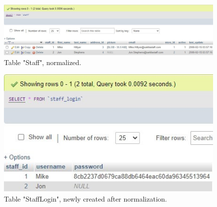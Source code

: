 \documentclass[openany]{article}
\begin{document}
		\begin{figure}[H]
			\includegraphics[width=\textwidth]{table_staff_norm}
			\caption{Table "Staff", normalized.}
		\end{figure}
		\begin{figure}[H]
			\includegraphics[width=\textwidth]{table_stafflogin_norm}
			\caption{Table "Staff\textunderscore Login", newly created after normalization.}
		\end{figure}
\end{document}
